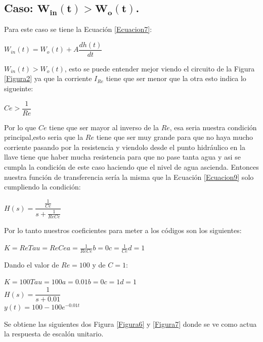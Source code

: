 \documentclass[12pt,a4paper]{article}
\begin{document}
\subsection{Caso: $\mathbf{W_{in}(t) > W_{o}(t)}$.}
Para este caso se tiene la Ecuación \ref{Ecuacion7}:
\begin{center}
$W_{in}(t) = W_{o}(t) + A\dfrac{dh(t)}{dt}$
\end{center}
$W_{in}(t) > W_{o}(t)$, esto se puede entender mejor viendo el circuito de la Figura \ref{Figura2} ya que la corriente $I_{Re}$ tiene que ser menor que la otra esto indica lo sigueinte:
\begin{center}
$Ce > \dfrac{1}{Re}$
\end{center}
Por lo que $Ce$ tiene que ser mayor al inverso de la $Re$, esa seria nuestra condición principal,esto seria que la $Re$ tiene que ser muy grande para que no haya mucho corriente pasando por la resistencia y viendolo desde el punto hidráulico en la llave tiene que haber mucha resistencia para que no pase tanta agua y asi se cumpla la condición de este caso haciendo que el nivel de agua ascienda. Entonces nuestra función de transferencia sería la misma que la Ecuación \ref{Ecuacion9} solo cumpliendo la condición:
\begin{center}
$H(s) = \dfrac{\frac{1}{Ce}}{s + \frac{1}{ReCe}}$
\end{center}
Por lo tanto nuestros coeficientes para meter a los códigos son los siguientes:
\begin{center}
$K = Re$\hspace{3cm}$Tau = ReCe$\hspace{3cm}$a = \frac{1}{ReCe}$\hspace{3cm}$b = 0$\hspace{3cm}$c = \frac{1}{Ce}$\hspace{3cm}$d = 1$
\end{center} 
Dando el valor de $Re = 100$ y de $C=1$:
\begin{center}
$K = 100$\hspace{3cm}$Tau = 100$\hspace{3cm}$a = 0.01$\hspace{3cm}$b = 0$\hspace{3cm}$c = 1$\hspace{3cm}$d = 1$\\[12pt]
$H(s) = \dfrac{1}{s + 0.01}$\\[12pt]
$y(t) = 100 - 100e^{-0.01t}$\\[12pt]
\end{center} 
Se obtiene las siguientes dos Figura \ref{Figura6} y \ref{Figura7} donde se ve como actua la respuesta de escalón unitario.\\
\end{document}
